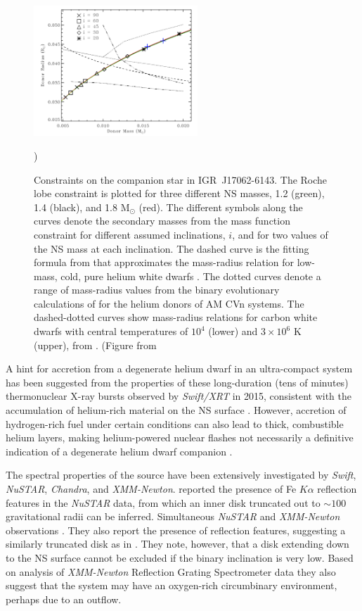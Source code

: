 \documentclass[graybox]{svmult}
\def \swift {{\em Swift\xspace}}
\def \chandra {{\em Chandra\xspace}}
\def \xmm {{\em XMM-Newton\xspace}}
\def \swiftxrt{{\em Swift/XRT\xspace}}
\def \nustar{{\em NuSTAR\xspace}}
\begin{document}
\begin{figure}
\centering
  \includegraphics[width=0.55\textwidth]{REVIEW_AMXP/17062_donor_Strohmayer_2018.png}
  \caption{Constraints on the companion star in IGR~J17062-6143. The Roche lobe constraint is plotted for three different NS masses, 1.2 (green), 1.4 (black), and
1.8 M$_\odot$ (red). The different symbols along the curves denote the secondary masses
from the mass function constraint for different assumed inclinations, $i$, and for
two values of the NS mass at each inclination. The dashed curve is the fitting formula from \cite{Nelemans2001} that approximates the mass-radius relation for low-mass, cold,
pure helium white dwarfs \cite{Zapolsky1969}. The dotted curves
denote a range of mass-radius values from the binary evolutionary calculations of \cite{Deloye2007} for the helium donors of AM CVn systems. The
dashed-dotted curves show mass-radius relations for carbon white dwarfs with
central temperatures of $10^4$ (lower) and $3\times10^6$ K (upper), from \cite{Deloye2003}. (Figure from \cite{Strohmayer2018}})     
  \label{fig:17062_mass}
\end{figure}
A hint for accretion from a degenerate helium dwarf in an ultra-compact system has been suggested from the properties of these long-duration (tens of minutes) thermonuclear X-ray bursts observed by \swiftxrt{} in 2015, consistent with the accumulation of
helium-rich material on the NS surface \cite{Keek2017}. However, accretion of hydrogen-rich fuel under certain conditions can also lead to thick, combustible helium layers, making helium-powered nuclear flashes not necessarily a definitive indication of a degenerate helium dwarf companion \cite{Fujimoto1981,Galloway2006}. 
 

The spectral properties of the source have been extensively investigated by \swift{}, \nustar{}, \chandra{}, and \xmm{}. \cite{Degenaar2017} reported the presence of Fe $K\alpha$ reflection features in the \nustar{} data, from which an inner disk truncated out to $\sim100$ gravitational radii can be inferred. Simultaneous \nustar{} and \xmm{} observations \cite{VandenEijnden2018}. They also report the presence of reflection features, suggesting a similarly truncated disk as in \cite{Degenaar2017}. They note, however, that a disk extending down to the NS surface cannot be excluded if the binary inclination is very low. Based on analysis of \xmm{} Reflection Grating Spectrometer data they also suggest that the system may have an oxygen-rich circumbinary environment, perhaps due to an outflow.
\end{document}
